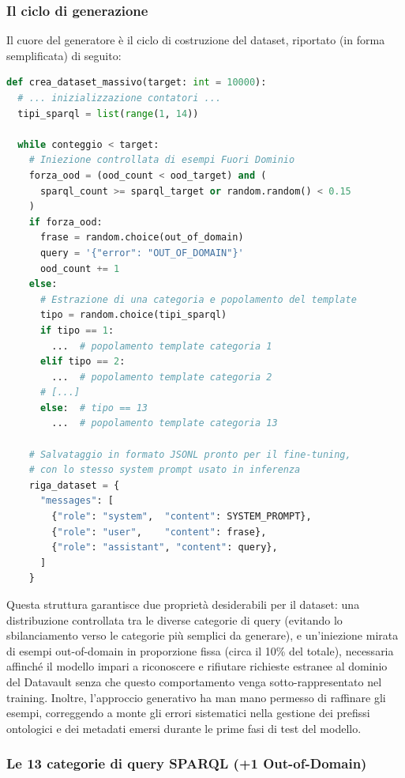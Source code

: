 \documentclass[12pt,a4paper,oneside]{book}
\begin{document}
    \subsubsection{Il ciclo di generazione}
      Il cuore del generatore è il ciclo di costruzione del dataset, riportato (in forma semplificata) di seguito:

      \begin{lstlisting}[language=python, caption=Struttura del ciclo di generazione del dataset]
def crea_dataset_massivo(target: int = 10000):
  # ... inizializzazione contatori ...
  tipi_sparql = list(range(1, 14))

  while conteggio < target:
    # Iniezione controllata di esempi Fuori Dominio
    forza_ood = (ood_count < ood_target) and (
      sparql_count >= sparql_target or random.random() < 0.15
    )
    if forza_ood:
      frase = random.choice(out_of_domain)
      query = '{"error": "OUT_OF_DOMAIN"}'
      ood_count += 1
    else:
      # Estrazione di una categoria e popolamento del template
      tipo = random.choice(tipi_sparql)
      if tipo == 1:
        ...  # popolamento template categoria 1
      elif tipo == 2:
        ...  # popolamento template categoria 2
      # [...]
      else:  # tipo == 13
        ...  # popolamento template categoria 13

    # Salvataggio in formato JSONL pronto per il fine-tuning,
    # con lo stesso system prompt usato in inferenza
    riga_dataset = {
      "messages": [
        {"role": "system",  "content": SYSTEM_PROMPT},
        {"role": "user",    "content": frase},
        {"role": "assistant", "content": query},
      ]
    }
\end{lstlisting}

Questa struttura garantisce due proprietà desiderabili per il dataset: una distribuzione controllata tra le diverse categorie di query (evitando lo sbilanciamento verso le categorie più semplici da generare), e un'iniezione mirata di esempi out-of-domain in proporzione fissa (circa il 10\% del totale), necessaria affinché il modello impari a riconoscere e rifiutare richieste estranee al dominio del Datavault senza che questo comportamento venga sotto-rappresentato nel training.
Inoltre, l'approccio generativo ha man mano permesso di raffinare gli esempi, correggendo a monte gli errori sistematici nella gestione dei prefissi ontologici e dei metadati emersi durante le prime fasi di test del modello.

\subsubsection{Le 13 categorie di query SPARQL (+1 Out-of-Domain)}
\end{document}
